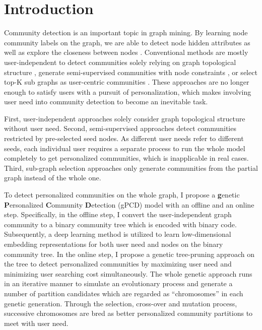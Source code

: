 \section{Introduction}
Community detection is an important topic in graph mining. By learning node community labels on the graph, we are able to detect node hidden attributes as well as explore the closeness between nodes \cite{fortunato2010community}. Conventional methods are mostly user-independent to detect communities solely relying on graph topological structure \cite{fortunato2016community}, generate semi-supervised communities with node constraints \cite{jin2019graph}, or select top-K sub graphs as user-centric communities \cite{li2015influential}. These approaches are no longer enough to satisfy users with a pursuit of personalization, which makes involving user need into community detection to become an inevitable task.

First, user-independent approaches solely consider graph topological structure without user need. Second, semi-supervised approaches detect communities restricted by pre-selected seed nodes. As different user needs refer to different seeds, each individual user requires a separate process to run the whole model completely to get personalized communities, which is inapplicable in real cases. Third, sub-graph selection approaches only generate communities from the partial graph instead of the whole one.  

To detect personalized communities on the whole graph, I propose a \textbf{g}enetic \textbf{P}ersonalized \textbf{C}ommunity \textbf{D}etection (gPCD) model with an offline and an online step. Specifically, in the offline step, I convert the user-independent graph community to a binary community tree which is encoded with binary code. Subsequently, a deep learning method is utilized to learn low-dimensional embedding representations for both user need and nodes on the binary community tree. In the online step, I propose a genetic tree-pruning approach on the tree to detect personalized communities by maximizing user need and minimizing user searching cost simultaneously. The whole genetic approach runs in an iterative manner to simulate an evolutionary process and generate a number of partition candidates which are regarded as ``chromosomes'' in each genetic generation. Through the selection, cross-over and mutation process, successive chromosomes are bred as better personalized community partitions to meet with user need.
